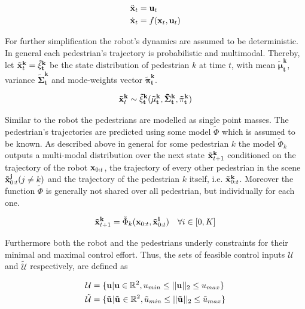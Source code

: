 \begin{align}
\ddot{\mathbf{x}}_t &= \mathbf{u}_t \\
\dot{\mathbf{x}}_t &= f(\mathbf{x}_t, \mathbf{u}_t)
\label{eq:robot_dynamics}
\end{align}

For further simplification the robot's dynamics are assumed to be deterministic.
\newline
In general each pedestrian's trajectory is probabilistic and multimodal. Thereby,  let $\xped[k]_t = \mathbf{\tilde{\xi}_t^k}$ be the state distribution of pedestrian $k$ at time $t$, with mean $\mathbf{\tilde{\mu}_t^k}$, variance $\mathbf{\tilde{\Sigma}_t^k}$ and mode-weights vector $\mathbf{\tilde{\pi}_t^k}$. 

\begin{equation}
\xped[k]_t \sim \mathbf{\tilde{\xi}_t^k}(\mathbf{\tilde{\mu}_t^k}, \mathbf{\tilde{\Sigma}_t^k}, \mathbf{\tilde{\pi}_t^k})	
\end{equation}

Similar to the robot the pedestrians are modelled as single point masses. The pedestrian's trajectories are predicted using some model $\tilde{\Phi}$ which is assumed to be known. As described above in general for some pedestrian $k$ the model $\tilde{\Phi}_k$ outputs a multi-modal distribution over the next state $\xped[k]_{t+1}$ conditioned on the trajectory of the robot $\mathbf{x}_{0:t}$, the trajectory of every other pedestrian in the scene $\xped[j]_{0:t} (j \neq k)$ and the trajectory of the pedestrian $k$ itself, i.e. $\xped[k]_{0:t}$. Moreover the function $\tilde{\Phi}$ is generally not shared over all pedestrian, but individually for each one.

\begin{equation}
\xped[k]_{t+1} = \tilde{\Phi}_k(\x_{0:t}, \xped[i]_{0:t}) \quad \forall i \in [0, K]	
\end{equation}

Furthermore both the robot and the pedestrians underly constraints for their minimal and maximal control effort. Thus, the sets of feasible control inputs $\mathcal{U}$ and $\mathcal{\tilde{U}}$ respectively, are defined as 

\begin{align}
\mathcal{U} &= \{\u | \u \in \mathbb{R}^2, u_{min} \leq ||\u||_2 \leq u_{max}\} \\
\mathcal{\tilde{U}} &= \{\uped[] | \uped[] \in \mathbb{R}^2, \tilde{u}_{min} \leq ||\uped[]||_2 \leq \tilde{u}_{max}\} 
\end{align}
 
